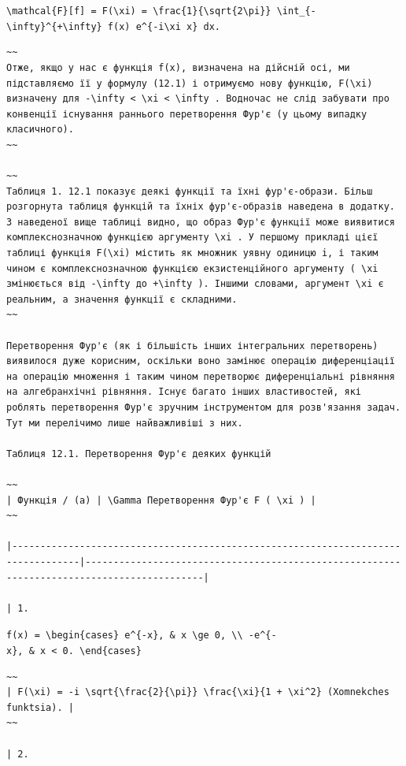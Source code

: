 \documentclass[
  ukrainian,
]{article}
\begin{document}
\texttt{\textbackslash{}mathcal\{F\}{[}f{]}\ =\ F(\textbackslash{}xi)\ =\ \textbackslash{}frac\{1\}\{\textbackslash{}sqrt\{2\textbackslash{}pi\}\}\ \textbackslash{}int\_\{-\textbackslash{}infty\}\^{}\{+\textbackslash{}infty\}\ f(x)\ e\^{}\{-i\textbackslash{}xi\ x\}\ dx.}

\begin{verbatim}
~~
Отже, якщо у нас є функція f(x), визначена на дійсній осі, ми підставляємо її у формулу (12.1) і отримуємо нову функцію, F(\xi) визначену для -\infty < \xi < \infty . Водночас не слід забувати про конвенції існування раннього перетворення Фур'є (у цьому випадку класичного).
~~

~~
Таблиця 1. 12.1 показує деякі функції та їхні фур'є-образи. Більш розгорнута таблиця функцій та їхніх фур'є-образів наведена в додатку. З наведеної вище таблиці видно, що образ Фур'є функції може виявитися комплекснозначною функцією аргументу \xi . У першому прикладі цієї таблиці функція F(\xi) містить як множник уявну одиницю i, і таким чином є комплекснозначною функцією екзистенційного аргументу ( \xi змінюється від -\infty до +\infty ). Іншими словами, аргумент \xi є реальним, а значення функції є складними.
~~

Перетворення Фур'є (як і більшість інших інтегральних перетворень) виявилося дуже корисним, оскільки воно замінює операцію диференціації на операцію множення і таким чином перетворює диференціальні рівняння на алгебранхічні рівняння. Існує багато інших властивостей, які роблять перетворення Фур'є зручним інструментом для розв'язання задач. Тут ми перелічимо лише найважливіші з них.

Таблиця 12.1. Перетворення Фур'є деяких функцій

~~
| Функція / (a) | \Gamma Перетворення Фур'є F ( \xi ) |
~~

|----------------------------------------------------------------------------------|-------------------------------------------------------------------------------------------|

| 1.
\end{verbatim}

\texttt{f(x)\ =\ \textbackslash{}begin\{cases\}\ e\^{}\{-x\},\ \&\ x\ \textbackslash{}ge\ 0,\ \textbackslash{}\textbackslash{}\ -e\^{}\{-x\},\ \&\ x\ \textless{}\ 0.\ \textbackslash{}end\{cases\}}

\begin{verbatim}
~~
| F(\xi) = -i \sqrt{\frac{2}{\pi}} \frac{\xi}{1 + \xi^2} (Xomnekches funktsia). |
~~

| 2.
\end{verbatim}
\end{document}
